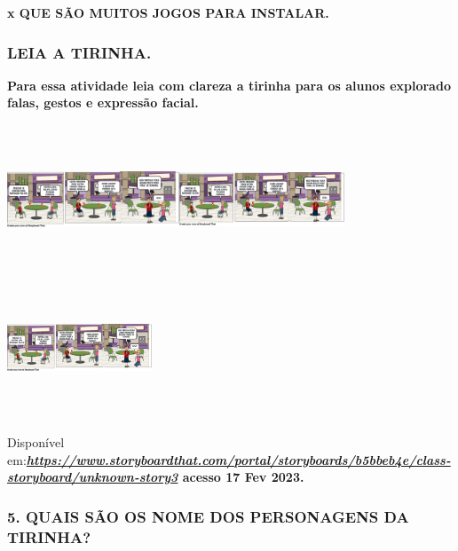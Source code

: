 \textbf{x QUE SÃO MUITOS JOGOS PARA INSTALAR.}

\subsubsection{LEIA A TIRINHA.}\label{leia-a-tirinha.}

\textbf{Para essa atividade leia com clareza a tirinha para os alunos
explorado falas, gestos e expressão facial.}

\includegraphics[width=2.02083in,height=1.75347in]{media/image173.png}\includegraphics[width=1.93472in,height=1.75347in]{media/image174.png}\includegraphics[width=1.70069in,height=1.64028in]{media/image175.png}

Disponível
em:\textbf{\href{https://www.storyboardthat.com/portal/storyboards/b5bbeb4e/class-storyboard/unknown-story3}{\emph{https://www.storyboardthat.com/portal/storyboards/b5bbeb4e/class-storyboard/unknown-story3}}
acesso 17 Fev 2023.}

\subsubsection{5. QUAIS SÃO OS NOME DOS PERSONAGENS DA
TIRINHA?}\label{quais-suxe3o-os-nome-dos-personagens-da-tirinha}

